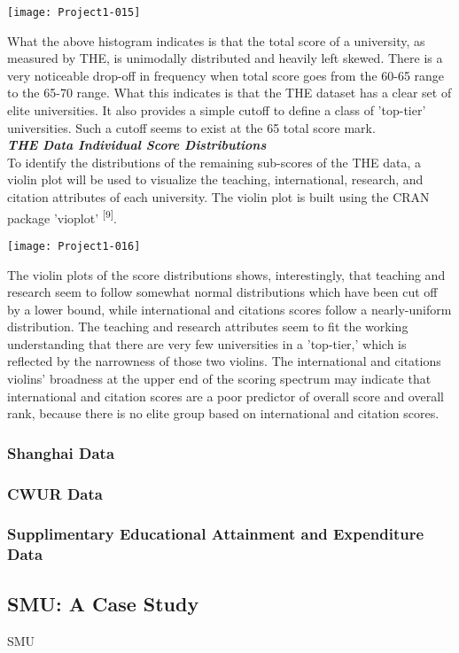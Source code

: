 \documentclass[12pt]{article}
\begin{document}
\texttt{[image: Project1-015]}

What the above histogram indicates is that the total score of a university, as measured by THE, is unimodally distributed and heavily left skewed. There is a very noticeable drop-off in frequency when total score goes from the 60-65 range to the 65-70 range. What this indicates is that the THE dataset has a clear set of elite universities. It also provides a simple cutoff to define a class of 'top-tier' universities. Such a cutoff seems to exist at the 65 total score mark. \\

\textbf{\textit{THE Data Individual Score Distributions}} \\

To identify the distributions of the remaining sub-scores of the THE data, a violin plot will be used to visualize the teaching, international, research, and citation attributes of each university. The violin plot is built using the CRAN package 'vioplot' \textsuperscript{[9]}.

\texttt{[image: Project1-016]}

The violin plots of the score distributions shows, interestingly, that teaching and research seem to follow somewhat normal distributions which have been cut off by a lower bound, while international and citations scores follow a nearly-uniform distribution. The teaching and research attributes seem to fit the working understanding that there are very few universities in a 'top-tier,' which is reflected by the narrowness of those two violins. The international and citations violins' broadness at the upper end of the scoring spectrum may indicate that international and citation scores are a poor predictor of overall score and overall rank, because there is no elite group based on international and citation scores.


\subsubsection{Shanghai Data}
\subsubsection{CWUR Data}
\subsubsection{Supplimentary Educational Attainment and Expenditure Data}


\subsection{SMU: A Case Study}
SMU
\end{document}
